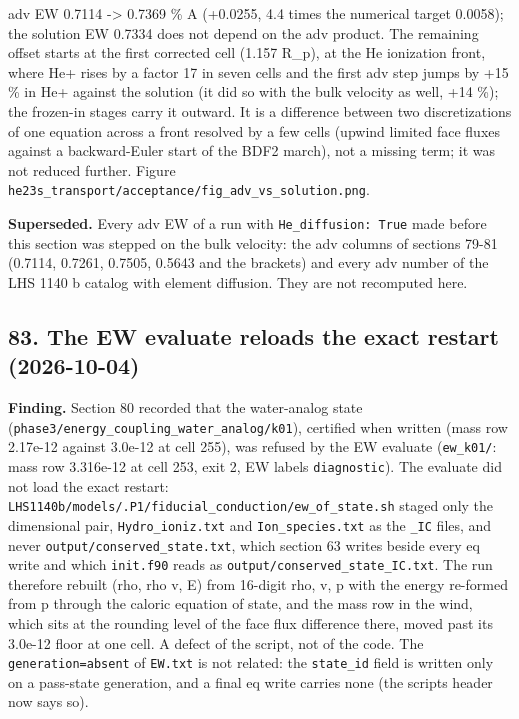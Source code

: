 \documentclass[english,a4paper]{my_memo}
\begin{document}
adv EW 0.7114 -\textgreater{} 0.7369 \% A (+0.0255, 4.4 times the numerical target
0.0058); the solution EW 0.7334 does not depend on the adv product. The
remaining offset starts at the first corrected cell (1.157 R\_p), at the He
ionization front, where He+ rises by a factor 17 in seven cells and the
first adv step jumps by +15 \% in He+ against the solution (it did so with
the bulk velocity as well, +14 \%); the frozen-in stages carry it outward.
It is a difference between two discretizations of one equation across a
front resolved by a few cells (upwind limited face fluxes against a
backward-Euler start of the BDF2 march), not a missing term; it was not
reduced further. Figure
\texttt{he23s\_transport/acceptance/fig\_adv\_vs\_solution.png}.

\textbf{Superseded.} Every adv EW of a run with \texttt{He\_diffusion:\ True} made before
this section was stepped on the bulk velocity: the adv columns of sections
79-81 (0.7114, 0.7261, 0.7505, 0.5643 and the bracket\textquotesingle s) and every adv
number of the LHS 1140 b catalog with element diffusion. They are not
recomputed here.

\subsection{83. The EW evaluate reloads the exact restart (2026-10-04)}\label{83-the-ew-evaluate-reloads-the-exact-restart-2026-10-04}

\textbf{Finding.} Section 80 recorded that the water-analog state
(\texttt{phase3/energy\_coupling\_water\_analog/k01}), certified when written (mass
row 2.17e-12 against 3.0e-12 at cell 255), was refused by the EW evaluate
(\texttt{ew\_k01/}: mass row 3.316e-12 at cell 253, exit 2, EW labels
\texttt{diagnostic}). The evaluate did not load the exact restart:
\texttt{LHS1140b/models/.P1/fiducial\_conduction/ew\_of\_state.sh} staged only the
dimensional pair, \texttt{Hydro\_ioniz.txt} and \texttt{Ion\_species.txt} as the \texttt{\_IC}
files, and never \texttt{output/conserved\_state.txt}, which section 63 writes
beside every \textquotesingle eq\textquotesingle{} write and which \texttt{init.f90} reads as
\texttt{output/conserved\_state\_IC.txt}. The run therefore rebuilt (rho, rho v, E)
from 16-digit rho, v, p with the energy re-formed from p through the
caloric equation of state, and the mass row in the wind, which sits at the
rounding level of the face flux difference there, moved past its 3.0e-12
floor at one cell. A defect of the script, not of the code. The
\texttt{generation=absent} of \texttt{EW.txt} is not related: the \texttt{state\_id} field is
written only on a pass-state generation, and a final \textquotesingle eq\textquotesingle{} write carries
none (the script\textquotesingle s header now says so).
\end{document}
